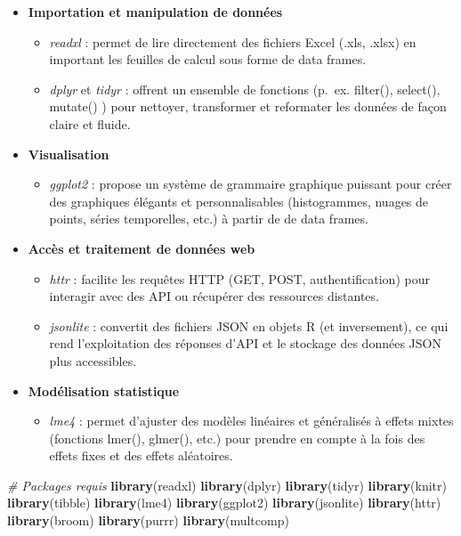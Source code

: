 \documentclass[
]{article}
\newenvironment{Shaded}{\begin{snugshade}}{\end{snugshade}}
\newcommand{\CommentTok}[1]{\textcolor[rgb]{0.56,0.35,0.01}{\textit{#1}}}
\newcommand{\FunctionTok}[1]{\textcolor[rgb]{0.13,0.29,0.53}{\textbf{#1}}}
\newcommand{\NormalTok}[1]{#1}
\providecommand{\tightlist}{%
  \setlength{\itemsep}{0pt}\setlength{\parskip}{0pt}}
\begin{document}
\begin{itemize}
\item
  \textbf{Importation et manipulation de données}

  \begin{itemize}
  \item
    \emph{readxl} : permet de lire directement des fichiers Excel (.xls,
    .xlsx) en important les feuilles de calcul sous forme de data
    frames.
  \item
    \emph{dplyr} et \emph{tidyr} : offrent un ensemble de fonctions
    (p.~ex. filter(), select(), mutate() ) pour nettoyer, transformer et
    reformater les données de façon claire et fluide.
  \end{itemize}
\item
  \textbf{Visualisation}

  \begin{itemize}
  \tightlist
  \item
    \emph{ggplot2} : propose un système de grammaire graphique puissant
    pour créer des graphiques élégants et personnalisables
    (histogrammes, nuages de points, séries temporelles, etc.) à partir
    de de data frames.
  \end{itemize}
\item
  \textbf{Accès et traitement de données web}

  \begin{itemize}
  \item
    \emph{httr} : facilite les requêtes HTTP (GET, POST,
    authentification) pour interagir avec des API ou récupérer des
    ressources distantes.
  \item
    \emph{jsonlite} : convertit des fichiers JSON en objets R (et
    inversement), ce qui rend l'exploitation des réponses d'API et le
    stockage des données JSON plus accessibles.
  \end{itemize}
\item
  \textbf{Modélisation statistique}

  \begin{itemize}
  \tightlist
  \item
    \emph{lme4} : permet d'ajuster des modèles linéaires et généralisés
    à effets mixtes (fonctions lmer(), glmer(), etc.) pour prendre en
    compte à la fois des effets fixes et des effets aléatoires.
  \end{itemize}
\end{itemize}

\begin{Shaded}
\begin{Highlighting}[]
\CommentTok{\# Packages requis}
\FunctionTok{library}\NormalTok{(readxl)}
\FunctionTok{library}\NormalTok{(dplyr)}
\FunctionTok{library}\NormalTok{(tidyr)}
\FunctionTok{library}\NormalTok{(knitr)}
\FunctionTok{library}\NormalTok{(tibble)}
\FunctionTok{library}\NormalTok{(lme4)}
\FunctionTok{library}\NormalTok{(ggplot2)}
\FunctionTok{library}\NormalTok{(jsonlite)}
\FunctionTok{library}\NormalTok{(httr)}
\FunctionTok{library}\NormalTok{(broom)}
\FunctionTok{library}\NormalTok{(purrr)}
\FunctionTok{library}\NormalTok{(multcomp)}
\end{Highlighting}
\end{Shaded}
\end{document}
